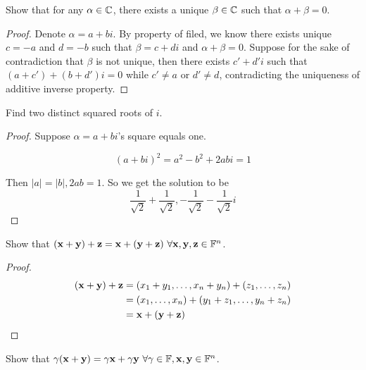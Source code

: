 \documentclass{extarticle}
\begin{document}
\begin{problem}{5}
    Show that for any \(\alpha \in \mathbb{C}\), there exists a unique \(\beta \in \mathbb{C}\) such
    that \(\alpha + \beta = 0\). 
\end{problem}

\begin{proof}
Denote \(\alpha = a + bi\). By property of filed, we know there exists unique 
\(c = -a\) and \(d = -b\) such that \(\beta = c + di\) and \(\alpha + \beta=0\). Suppose
for the sake of contradiction that \(\beta\) is not unique, then there exists 
\(c' + d'i\) such that \((a + c') + (b + d')i = 0\) while \(c' \neq a\) or \(d' \neq d\),
contradicting the uniqueness of additive inverse property.
\end{proof}


\begin{problem}{8}
    Find two distinct squared roots of \(i\). 
\end{problem}

\begin{proof}
Suppose \(\alpha = a + bi\)'s square equals one. 

\begin{equation*}
    (a + bi)^2 = a^2 - b^2 + 2abi = 1
\end{equation*}

Then \(|a| = |b|, 2ab = 1 \). So we get the solution to be 
\[\frac{1}{\sqrt{2}} + \frac{1}{\sqrt{2}}, -\frac{1}{\sqrt{2}} - \frac{1}{\sqrt{2}}i\] 
\end{proof}


\begin{problem}{10}
    Show that \((\mathbf{x} + \mathbf{y}) + \mathbf{z} = \mathbf{x} + (\mathbf{y} + \mathbf{z}) \ \forall  \mathbf{x}, \mathbf{y}, \mathbf{z} \in \mathbb{F}^n\). 
\end{problem}

\begin{proof}
\begin{align*}
    (\mathbf{x} + \mathbf{y}) + \mathbf{z} 
    &= (x_1 + y_1, \ldots, x_n + y_n) + (z_1 , \ldots, z_n) \\ 
    &= (x_1, \ldots, x_n) + (y_1 + z_1, \ldots, y_n + z_n) \\ 
    &= \mathbf{x} + (\mathbf{y} + \mathbf{z})
\end{align*}
\end{proof}


\begin{problem}{14}
    Show that \(\gamma(\mathbf{x} + \mathbf{y}) = \gamma \mathbf{x} + \gamma \mathbf{y} \ \forall \gamma \in \mathbb{F}, \mathbf{x}, \mathbf{y} \in \mathbb{F}^n\).
\end{problem}
\end{document}
